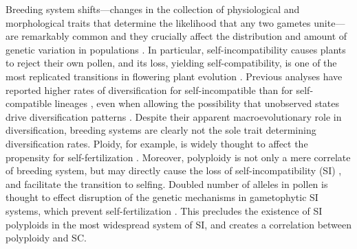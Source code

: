 Breeding system shifts---changes in the collection of physiological and morphological traits that determine the likelihood that any two gametes unite---are remarkably common and they crucially affect the distribution and amount of genetic variation in populations \citep{stebbins1974, barrett2013}.
In particular, self-incompatibility causes plants to reject their own pollen, and its loss, yielding self-compatibility, is one of the most replicated transitions in flowering plant evolution \citep{stebbins1974,igic_2008}. %
Previous analyses have reported higher rates of diversification for self-incompatible than for self-compatible lineages \citep{goldberg_2010, devos2014}, even when allowing the possibility that unobserved states drive diversification patterns \citep{freyman_2018}.
Despite their apparent macroevolutionary role in diversification, breeding systems are clearly not the sole trait determining diversification rates.
Ploidy, for example, is widely thought to affect the propensity for self-fertilization \citep{stebbins1950}. 
Moreover, polyploidy is not only a mere correlate of breeding system, but may directly cause the loss of self-incompatibility (SI) \citep{stout1942, lewis1947}, and facilitate the transition to selfing.
Doubled number of alleles in pollen is thought to effect disruption of the genetic mechanisms in gametophytic SI systems, which prevent self-fertilization \citep{entani1999, tsukamoto2005, kubo2010}. 
This precludes the existence of SI polyploids in the most widespread system of SI, and creates a correlation between polyploidy and SC.

